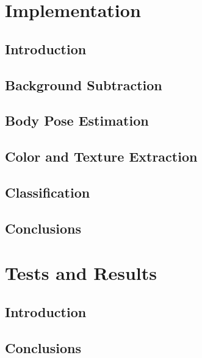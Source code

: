 \documentclass[titlepage,12pt,a4paper,times]{book}
\begin{document}
\chapter{Implementation}
\label{chap:imp}

\section{Introduction}
\label{chap3:sec:intro}

\section{Background Subtraction}
\label{chap3:sec:bs}

\section{Body Pose Estimation}
\label{chap3:sec:bps}

\section{Color and Texture Extraction}
\label{chap3:sec:cte}

\section{Classification}
\label{chap3:sec:nnt}

\section{Conclusions}
\label{chap3:sec:concs}

\chapter{Tests and Results}
\label{chap:res}

\section{Introduction}
\label{chap4:sec:intro}

\section{}
\label{chap4:sec:...}

\section{Conclusions}
\label{chap4:sec:concs}
\end{document}
